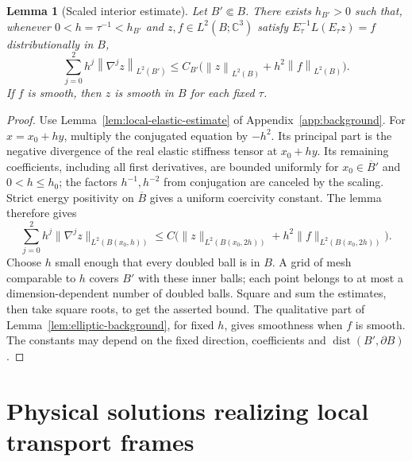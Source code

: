 \documentclass[11pt]{article}
\newcommand{\C}{\mathbb C}
\newcommand{\norm}[1]{\left\lVert #1\right\rVert}
\newtheorem{lemma}[theorem]{Lemma}
\theoremstyle{remark}
\numberwithin{equation}{section}
\begin{document}
\begin{lemma}[Scaled interior estimate]
\label{lem:scaled-interior}
Let $B'\Subset B$. There exists $h_{B'}>0$ such that, whenever
$0<h=\tau^{-1}<h_{B'}$ and $z,f\in L^2(B;\C^3)$ satisfy
$E_\tau^{-1}L(E_\tau z)=f$ distributionally in $B$,
\begin{equation}
\label{eq:scaled-interior}
 \sum_{j=0}^2 h^j\norm{\nabla^jz}_{L^2(B')}
 \le C_{B'}\bigl(\norm{z}_{L^2(B)}
                         +h^2\norm{f}_{L^2(B)}\bigr).
\end{equation}
If $f$ is smooth, then $z$ is smooth in $B$ for each fixed $\tau$.
\end{lemma}

\begin{proof}
Use Lemma~\ref{lem:local-elastic-estimate} of Appendix~\ref{app:background}.
For $x=x_0+hy$, multiply the conjugated equation by $-h^2$. Its principal
part is the negative divergence of the real elastic stiffness tensor at
$x_0+hy$. Its remaining coefficients, including all first derivatives,
are bounded uniformly for $x_0\in\overline B'$ and $0<h\le h_0$; the
factors $h^{-1},h^{-2}$ from conjugation are canceled by the scaling.
Strict energy positivity on $\overline B$ gives a uniform coercivity
constant. The lemma therefore gives
\[
 \sum_{j=0}^2h^j\|\nabla^jz\|_{L^2(B(x_0,h))}
 \le C\bigl(\|z\|_{L^2(B(x_0,2h))}+h^2\|f\|_{L^2(B(x_0,2h))}\bigr).
\]
Choose $h$ small enough that every doubled ball is in $B$. A grid of mesh
comparable to $h$ covers $B'$ with these inner balls; each point belongs
to at most a dimension-dependent number of doubled balls. Square and sum
the estimates, then take square roots, to get the asserted bound. The
qualitative part of Lemma~\ref{lem:elliptic-background}, for fixed $h$, gives
smoothness when $f$ is smooth. The constants may depend on the fixed
direction, coefficients and $\operatorname{dist}(B',\partial B)$.
\end{proof}

\section{Physical solutions realizing local transport frames}
\label{sec:physical-amplitudes}
\end{document}
